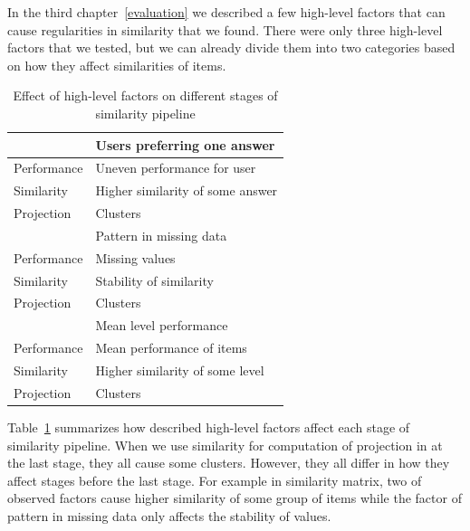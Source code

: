 \documentclass[
  print, %
  table,   %
  nolof,     %
  nolot,     %
  nocover,
  color,
  final,
]{fithesis3}
\begin{document}

In the third chapter~\ref{evaluation} we described a few high-level factors that can cause regularities in similarity that we found. There were only three high-level factors that we tested, but we can already divide them into two categories based on how they affect similarities of items.

\begin{table}
  \begin{tabular}{ | l | l | }
      \hline
      \cellcolor[gray]{1.0} & Users preferring one answer \\
      \hline
      Performance & Uneven performance for user      \\
      Similarity  & Higher similarity of some answer \\
      Projection  & Clusters                         \\
      \hline
      \hline
      \cellcolor[gray]{1.0} & Pattern in missing data     \\
      \hline
      Performance & Missing values                   \\
      Similarity  & Stability of similarity          \\
      Projection  & Clusters                         \\
      \hline
      \hline
      \cellcolor[gray]{1.0} & Mean level performance      \\
      \hline
      Performance & Mean performance of items        \\
      Similarity  & Higher similarity of some level  \\
      Projection  & Clusters                         \\
      \hline
  \end{tabular}
  \caption{Effect of high-level factors on different stages of similarity pipeline}
  \label{tab:effect-of-factors-on-stages}
\end{table}

Table~\ref{tab:effect-of-factors-on-stages} summarizes how described high-level factors affect each stage of similarity pipeline. When we use similarity for computation of projection in at the last stage, they all cause some clusters. However, they all differ in how they affect stages before the last stage. For example in similarity matrix, two of observed factors cause higher similarity of some group of items while the factor of pattern in missing data only affects the stability of values.
\end{document}
